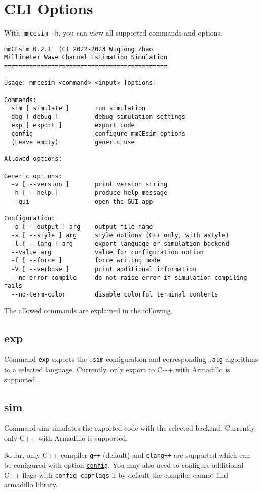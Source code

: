 \section{CLI Options}
With \texttt{mmcesim -h}, you can view all supported commands and options.
\begin{lstlisting}
mmCEsim 0.2.1  (C) 2022-2023 Wuqiong Zhao
Millimeter Wave Channel Estimation Simulation
=============================================

Usage: mmcesim <command> <input> [options]

Commands:
  sim [ simulate ]       run simulation
  dbg [ debug ]          debug simulation settings
  exp [ export ]         export code
  config                 configure mmCEsim options
  (Leave empty)          generic use

Allowed options:

Generic options:
  -v [ --version ]       print version string
  -h [ --help ]          produce help message
  --gui                  open the GUI app

Configuration:
  -o [ --output ] arg    output file name
  -s [ --style ] arg     style options (C++ only, with astyle)
  -l [ --lang ] arg      export language or simulation backend
  --value arg            value for configuration option
  -f [ --force ]         force writing mode
  -V [ --verbose ]       print additional information
  --no-error-compile     do not raise error if simulation compiling fails
  --no-term-color        disable colorful terminal contents
\end{lstlisting}

The allowed commands are explained in the following.

\subsection{exp}
Command \texttt{exp} exports the \texttt{.sim} configuration and corresponding \texttt{.alg} algorithms
to a selected language.
Currently, only export to C++ with Armadillo is supported.

\subsection{sim}
Command sim simulates the exported code with the selected backend. Currently, only C++ with Armadillo is supported.

So far, only C++ compiler \texttt{g++} (default) and \texttt{clang++} are supported which can be configured with option \hyperref[d:subsec:config]{\texttt{config}}.
You may also need to configure additional C++ flags with \texttt{config cppflags} if by default the compiler cannot find
\href{https://arma.sourceforge.net/}{armadillo}
library.

